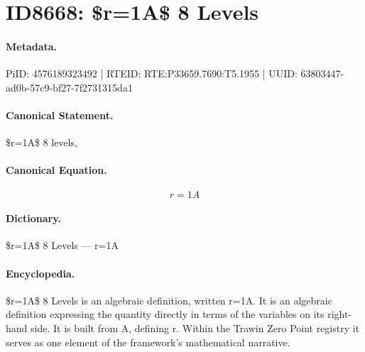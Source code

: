 \section*{ID8668: \$r=1A\$ 8 Levels}
\paragraph{Metadata.}
PiID: 4576189323492 | RTEID: RTE:P33659.7690:T5.1955 | UUID: 63803447-ad0b-57c9-bf27-7f2731315da1

\paragraph{Canonical Statement.}
\$r=1A\$ 8 levels,

\paragraph{Canonical Equation.}
\[
r=1A
\]

\paragraph{Dictionary.}
\$r=1A\$ 8 Levels — r=1A

\paragraph{Encyclopedia.}
\$r=1A\$ 8 Levels is an algebraic definition, written r=1A. It is an algebraic definition expressing the quantity directly in terms of the variables on its right-hand side. It is built from A, defining r. Within the Trawin Zero Point registry it serves as one element of the framework's mathematical narrative.
